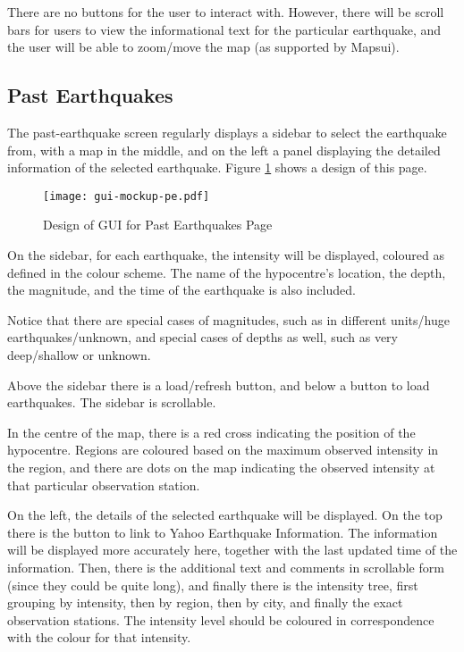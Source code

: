 There are no buttons for the user to interact with. However, there will be scroll bars for users to view the informational text for the particular earthquake, and the user will be able to zoom/move the map (as supported by Mapsui).

\subsection{Past Earthquakes}

The past-earthquake screen regularly displays a sidebar to select the earthquake from, with a map in the middle, and on the left a panel displaying the detailed information of the selected earthquake. Figure \ref{fig:gui-mockup-pe} shows a design of this page.

\begin{figure}[htp]
    \centering
    \texttt{[image: gui-mockup-pe.pdf]}
    \caption{Design of GUI for Past Earthquakes Page}
    \label{fig:gui-mockup-pe}
\end{figure}

On the sidebar, for each earthquake, the intensity will be displayed, coloured as defined in the colour scheme. The name of the hypocentre's location, the depth, the magnitude, and the time of the earthquake is also included.

Notice that there are special cases of magnitudes, such as in different units/huge earthquakes/unknown, and special cases of depths as well, such as very deep/shallow or unknown.

Above the sidebar there is a load/refresh button, and below a button to load earthquakes. The sidebar is scrollable.

In the centre of the map, there is a red cross indicating the position of the hypocentre. Regions are coloured based on the maximum observed intensity in the region, and there are dots on the map indicating the observed intensity at that particular observation station.

On the left, the details of the selected earthquake will be displayed. On the top there is the button to link to Yahoo Earthquake Information. The information will be displayed more accurately here, together with the last updated time of the information. Then, there is the additional text and comments in scrollable form (since they could be quite long), and finally there is the intensity tree, first grouping by intensity, then by region, then by city, and finally the exact observation stations. The intensity level should be coloured in correspondence with the colour for that intensity.

